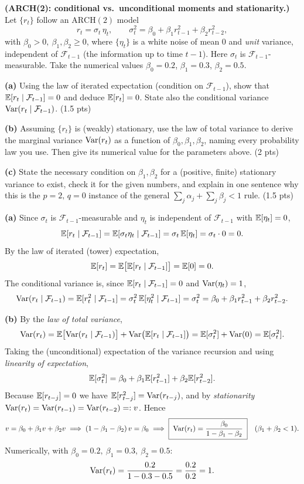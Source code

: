 \documentclass[11pt]{article}
\newcommand{\F}{\mathcal{F}}
\begin{document}

\statementstart
\textbf{(ARCH(2): conditional vs.\ unconditional moments and stationarity.)} Let $\{r_t\}$ follow an $\mathrm{ARCH}(2)$ model
\[
r_t=\sigma_t\,\eta_t ,\qquad
\sigma_t^2=\beta_0+\beta_1 r_{t-1}^2+\beta_2 r_{t-2}^2 ,
\]
with $\beta_0>0,\ \beta_1,\beta_2\ge0$, where $\{\eta_t\}$ is a white noise of mean $0$ and \emph{unit} variance, independent of $\F_{t-1}$ (the information up to time $t-1$). Here $\sigma_t$ is $\F_{t-1}$-measurable. Take the numerical values $\beta_0=0.2$, $\beta_1=0.3$, $\beta_2=0.5$.

\textbf{(a)} Using the law of iterated expectation (condition on $\F_{t-1}$), show that $\E[r_t\mid\F_{t-1}]=0$ and deduce $\mathbb{E}[r_t]=0$. State also the conditional variance $\Var(r_t\mid\F_{t-1})$. \hfill(1.5 pts)

\textbf{(b)} Assuming $\{r_t\}$ is (weakly) stationary, use the law of total variance to derive the marginal variance $\operatorname{Var}(r_t)$ as a function of $\beta_0,\beta_1,\beta_2$, naming every probability law you use. Then give its numerical value for the parameters above. \hfill(2 pts)

\textbf{(c)} State the necessary condition on $\beta_1,\beta_2$ for a (positive, finite) stationary variance to exist, check it for the given numbers, and explain in one sentence why this is the $p=2,\,q=0$ instance of the general $\sum_j\alpha_j+\sum_j\beta_j<1$ rule. \hfill(1.5 pts)
\statementend

\textbf{(a)} Since $\sigma_t$ is $\F_{t-1}$-measurable and $\eta_t$ is independent of $\F_{t-1}$ with $\mathbb{E}[\eta_t]=0$,
\[
\E[r_t\mid\F_{t-1}]=\E[\sigma_t\eta_t\mid\F_{t-1}]=\sigma_t\,\E[\eta_t]=\sigma_t\cdot0=0 .
\]
By the law of iterated (tower) expectation,
\[
\E[r_t]=\E\bigl[\E[r_t\mid\F_{t-1}]\bigr]=\E[0]=0 .
\]
The conditional variance is, since $\E[r_t\mid\F_{t-1}]=0$ and $\operatorname{Var}(\eta_t)=1$,
\[
\Var(r_t\mid\F_{t-1})=\E[r_t^2\mid\F_{t-1}]=\sigma_t^2\,\E[\eta_t^2\mid\F_{t-1}]=\sigma_t^2
=\beta_0+\beta_1 r_{t-1}^2+\beta_2 r_{t-2}^2 .
\]

\textbf{(b)} By the \emph{law of total variance},
\[
\Var(r_t)=\E\bigl[\Var(r_t\mid\F_{t-1})\bigr]+\Var\bigl(\E[r_t\mid\F_{t-1}]\bigr)
=\E[\sigma_t^2]+\Var(0)=\E[\sigma_t^2].
\]
Taking the (unconditional) expectation of the variance recursion and using \emph{linearity of expectation},
\[
\mathbb{E}[\sigma_t^2]=\beta_0+\beta_1\mathbb{E}[r_{t-1}^2]+\beta_2\mathbb{E}[r_{t-2}^2].
\]
Because $\mathbb{E}[r_{t-j}]=0$ we have $\mathbb{E}[r_{t-j}^2]=\operatorname{Var}(r_{t-j})$, and by \emph{stationarity}
$\operatorname{Var}(r_t)=\operatorname{Var}(r_{t-1})=\operatorname{Var}(r_{t-2})=:v$. Hence
\[
v=\beta_0+\beta_1 v+\beta_2 v
\;\Longrightarrow\;
(1-\beta_1-\beta_2)\,v=\beta_0
\;\Longrightarrow\;
\boxed{\;\operatorname{Var}(r_t)=\frac{\beta_0}{1-\beta_1-\beta_2}\;}\quad(\beta_1+\beta_2<1).
\]
Numerically, with $\beta_0=0.2,\ \beta_1=0.3,\ \beta_2=0.5$:
\[
\operatorname{Var}(r_t)=\frac{0.2}{1-0.3-0.5}=\frac{0.2}{0.2}=1 .
\]
\end{document}
